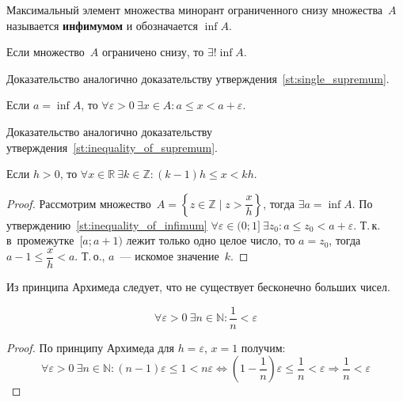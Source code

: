  Максимальный элемент множества минорант ограниченного снизу множества~$A$ называется \textbf{инфимумом} и обозначается $\inf A$.

\begin{statement}
Если множество~$A$ ограничено снизу, то $\exists! \inf A$.
\end{statement}%
Доказательство аналогично доказательству утверждения~\ref*{st:single_supremum}.

\begin{statement}
\label{st:inequality_of_infimum}
Если $a = \inf A$, то $\forall \varepsilon > 0 \ \exists x \in A \colon a \leqslant x < a + \varepsilon$.
\end{statement}%
Доказательство аналогично доказательству утверждения~\ref*{st:inequality_of_supremum}.

\begin{theorem}
Если $h > 0$, то
$\forall x \in \mathbb R \ \exists k \in \mathbb Z \colon (k - 1)h \leqslant x < kh$.
\end{theorem}
\begin{proof}
Рассмотрим множество~$A = \left\{ z \in \mathbb Z \mid z > \dfrac{x}h \right\}$, тогда $\exists a = \inf A$.
По утверждению~\ref*{st:inequality_of_infimum}
$\forall \varepsilon \in (0; 1] \ \exists z_0 \colon a \leqslant z_0 < a + \varepsilon$.
Т.\,к. в~промежутке~$[a; a + 1)$ лежит только одно целое число, то $a = z_0$, тогда $a - 1 \leqslant \dfrac{x}h < a$.
Т.\,о., $a$~--- искомое значение~$k$.
\end{proof}

Из принципа Архимеда следует, что не существует бесконечно больших чисел.

\begin{consequent}
\label{conseq:small_rational_exists}
\begin{equation*}
\forall \varepsilon > 0 \ \exists n \in \mathbb N \colon \frac1n < \varepsilon
\end{equation*}
\end{consequent}
\begin{proof}
По принципу Архимеда для $h = \varepsilon$, $x = 1$ получим:
\begin{equation*}
\forall \varepsilon > 0 \ \exists n \in \mathbb N \colon
(n - 1)\varepsilon \leqslant 1 < n\varepsilon \Leftrightarrow
(1 - \frac1n)\varepsilon \leqslant \frac1n < \varepsilon \Rightarrow
\frac1n < \varepsilon
\end{equation*}
\end{proof}

